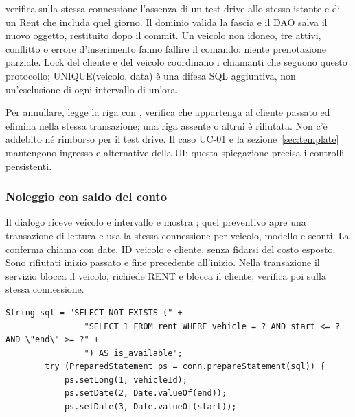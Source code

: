  verifica sulla
stessa connessione l'assenza di un test drive allo stesso istante e di un
Rent che includa quel giorno. Il dominio valida la fascia e il DAO salva
il nuovo oggetto, restituito dopo il commit. Un veicolo non idoneo, tre
attivi, conflitto o errore d'inserimento fanno fallire il comando: niente
prenotazione parziale. Lock del cliente e del veicolo coordinano i chiamanti
che seguono questo protocollo; UNIQUE(veicolo, data) è una difesa SQL
aggiuntiva, non un'esclusione di ogni intervallo di un'ora.

Per annullare,  legge la riga con , verifica
che appartenga al cliente passato ed elimina nella stessa transazione;
una riga assente o altrui è rifiutata. Non c'è addebito né rimborso per il
test drive. Il caso UC-01 e la sezione~\ref{sec:template} mantengono ingresso
e alternative della UI; questa spiegazione precisa i controlli persistenti.

\subsubsection{Noleggio con saldo del conto}
Il dialogo riceve veicolo e intervallo e mostra ;
quel preventivo apre una transazione di lettura e usa la stessa connessione
per veicolo, modello e sconti. La conferma chiama  con
date, ID veicolo e cliente, senza fidarsi del costo esposto. Sono rifiutati
inizio passato e fine precedente all'inizio. Nella transazione il servizio
blocca il veicolo, richiede RENT e blocca il cliente; verifica poi
 sulla stessa connessione.

\noindent\begin{minipage}{\linewidth}
\begin{lstlisting}[firstnumber=98,gobble=8,caption={Query di disponibilità e ordine dei parametri; omessi esecuzione e gestione errori.},label=lst:overlap]
        String sql = "SELECT NOT EXISTS (" +
                "SELECT 1 FROM rent WHERE vehicle = ? AND start <= ? AND \"end\" >= ?" +
                ") AS is_available";
        try (PreparedStatement ps = conn.prepareStatement(sql)) {
            ps.setLong(1, vehicleId);
            ps.setDate(2, Date.valueOf(end));
            ps.setDate(3, Date.valueOf(start));
\end{lstlisting}
\end{minipage}

